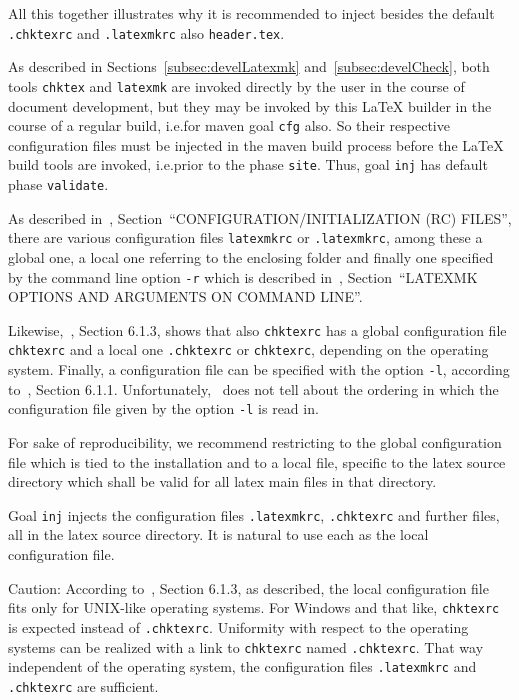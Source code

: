 All this together illustrates why it is recommended to inject 
besides the default \texttt{.chktexrc} and \texttt{.latexmkrc} 
also \texttt{header.tex}. 
\medskip


As described in Sections~\ref{subsec:develLatexmk} and~\ref{subsec:develCheck}, 
both tools \texttt{chktex} and \texttt{latexmk} 
are invoked directly by the user in the course of document development, 
but they may be invoked by this \LaTeX{} builder in the course of a regular build, 
i.e.\@ for maven goal \texttt{cfg} also. 
So their respective configuration files must be injected 
in the maven build process before the \LaTeX{} build tools are invoked, 
i.e.\@ prior to the phase \texttt{site}. 
Thus, goal \texttt{inj} has default phase \texttt{validate}. 


As described in~\cite{LatexMk23}, 
Section~``CONFIGURATION/INITIALIZATION (RC) FILES'', 
there are various configuration files \texttt{latexmkrc} or \texttt{.latexmkrc}, 
among these a global one, a local one referring to the enclosing folder 
and finally one specified by the command line option \texttt{-r} 
which is described in~\cite{LatexMk23}, 
Section~``LATEXMK OPTIONS AND ARGUMENTS ON COMMAND LINE''. 

Likewise,~\cite{ChkTeX22}, Section 6.1.3, shows that also \texttt{chktexrc} 
has a global configuration file \texttt{chktexrc} 
and a local one \texttt{.chktexrc} or \texttt{chktexrc}, 
depending on the operating system. 
Finally, a configuration file can be specified with the option \texttt{-l}, 
according to~\cite{ChkTeX22}, Section 6.1.1. 
Unfortunately,~\cite{ChkTeX22} does not tell about the ordering 
in which the configuration file given by the option \texttt{-l} is read in. 

For sake of reproducibility, we recommend restricting to the global configuration file 
which is tied to the installation and to a local file, specific to the latex source directory 
which shall be valid for all latex main files in that directory. 

Goal \texttt{inj} injects the configuration files \texttt{.latexmkrc}, \texttt{.chktexrc} 
and further files, 
all in the latex source directory. 
It is natural to use each as the local configuration file. 

Caution: According to~\cite{ChkTeX22}, Section 6.1.3, 
as described, the local configuration file fits only for UNIX-like operating systems. 
For Windows and that like, \texttt{chktexrc} is expected instead of \texttt{.chktexrc}. 
Uniformity with respect to the operating systems can be realized 
with a link to \texttt{chktexrc} named \texttt{.chktexrc}. 
That way independent of the operating system, 
the configuration files \texttt{.latexmkrc} and \texttt{.chktexrc} are sufficient. 

